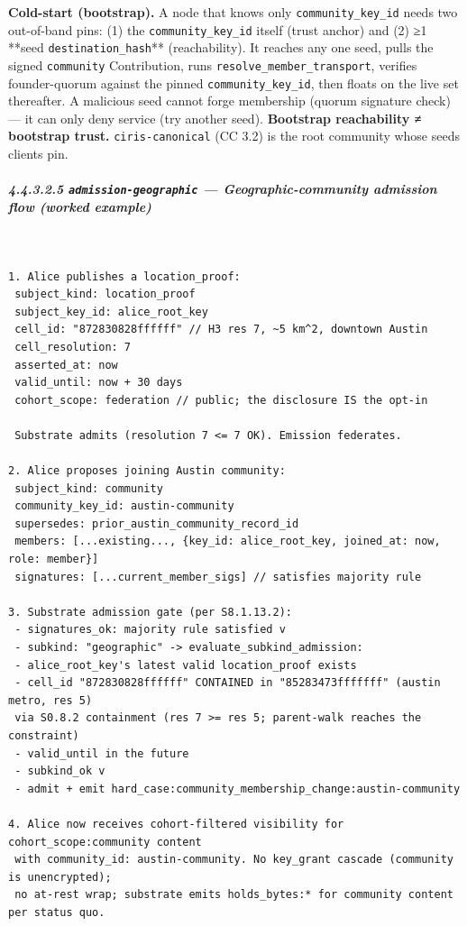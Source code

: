 \documentclass[11pt]{article}
\begin{document}
\textbf{Cold-start (bootstrap).} A node that knows only \texttt{community\_key\_id} needs two out-of-band pins: (1) the \texttt{community\_key\_id} itself (trust anchor) and (2) ≥1 **seed \texttt{destination\_hash}** (reachability). It reaches any one seed, pulls the signed \texttt{community} Contribution, runs \texttt{resolve\_member\_transport}, verifies founder-quorum against the pinned \texttt{community\_key\_id}, then floats on the live set thereafter. A malicious seed cannot forge membership (quorum signature check) — it can only deny service (try another seed). \textbf{Bootstrap reachability ≠ bootstrap trust.} \texttt{ciris-canonical} (CC 3.2) is the root community whose seeds clients pin.


\subparagraph{4.4.3.2.5 \texttt{admission-geographic} — Geographic-community admission flow (worked example)}\mbox{}\\


\begin{lstlisting}
1. Alice publishes a location_proof:
 subject_kind: location_proof
 subject_key_id: alice_root_key
 cell_id: "872830828ffffff" // H3 res 7, ~5 km^2, downtown Austin
 cell_resolution: 7
 asserted_at: now
 valid_until: now + 30 days
 cohort_scope: federation // public; the disclosure IS the opt-in

 Substrate admits (resolution 7 <= 7 OK). Emission federates.

2. Alice proposes joining Austin community:
 subject_kind: community
 community_key_id: austin-community
 supersedes: prior_austin_community_record_id
 members: [...existing..., {key_id: alice_root_key, joined_at: now, role: member}]
 signatures: [...current_member_sigs] // satisfies majority rule

3. Substrate admission gate (per S8.1.13.2):
 - signatures_ok: majority rule satisfied v
 - subkind: "geographic" -> evaluate_subkind_admission:
 - alice_root_key's latest valid location_proof exists
 - cell_id "872830828ffffff" CONTAINED in "85283473fffffff" (austin metro, res 5)
 via S0.8.2 containment (res 7 >= res 5; parent-walk reaches the constraint)
 - valid_until in the future
 - subkind_ok v
 - admit + emit hard_case:community_membership_change:austin-community

4. Alice now receives cohort-filtered visibility for cohort_scope:community content
 with community_id: austin-community. No key_grant cascade (community is unencrypted);
 no at-rest wrap; substrate emits holds_bytes:* for community content per status quo.
\end{lstlisting}
\end{document}
